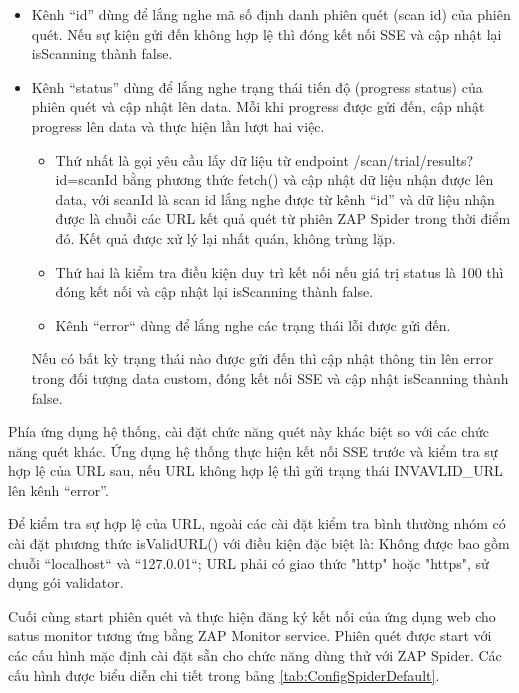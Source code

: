 \begin{itemize}
  \item Kênh “id” dùng để lắng nghe mã số định danh phiên quét (scan id) của phiên quét.
  Nếu sự kiện gửi đến không hợp lệ thì đóng kết nối SSE và cập nhật lại isScanning thành false.
  \item Kênh “status” dùng để lắng nghe trạng thái tiến độ (progress status) của phiên quét và cập nhật lên data.
  Mỗi khi progress được gửi đến, cập nhật progress lên data và thực hiện lần lượt hai việc.
  \begin{itemize}
    \item Thứ nhất là gọi yêu cầu lấy dữ liệu từ endpoint /scan/trial/results?id=scanId bằng phương thức fetch() và cập nhật dữ liệu nhận được lên data, với scanId là scan id lắng nghe được từ kênh “id” và dữ liệu nhận được là chuỗi các URL kết quả quét từ phiên ZAP Spider trong thời điểm đó.
    Kết quả được xử lý lại nhất quán, không trùng lặp.
    \item Thứ hai là kiểm tra điều kiện duy trì kết nối nếu giá trị status là 100 thì đóng kết nối và cập nhật lại isScanning thành false.
    \item Kênh “error“ dùng để lắng nghe các trạng thái lỗi được gửi đến.
  \end{itemize}
  Nếu có bất kỳ trạng thái nào được gửi đến thì cập nhật thông tin lên error trong đối tượng data custom, đóng kết nối SSE và cập nhật isScanning thành false.
\end{itemize}

Phía ứng dụng hệ thống, cài đặt chức năng quét này khác biệt so với các chức năng quét khác.
Ứng dụng hệ thống thực hiện kết nối SSE trước và kiểm tra sự hợp lệ của URL sau, nếu URL không hợp lệ thì gửi trạng thái INVAVLID\_URL lên kênh “error”.

Để kiểm tra sự hợp lệ của URL, ngoài các cài đặt kiểm tra bình thường nhóm có cài đặt phương thức isValidURL() với điều kiện đặc biệt là: Không được bao gồm chuỗi “localhost“ và “127.0.01“; URL phải có giao thức "http" hoặc "https", sử dụng gói validator.

Cuối cùng start phiên quét và thực hiện đăng ký kết nối của ứng dụng web cho satus monitor tương ứng bằng ZAP Monitor service.
Phiên quét được start với các cấu hình mặc định cài đặt sẵn cho chức năng dùng thử với ZAP Spider.
Các cấu hình được biểu diễn chi tiết trong bảng \ref{tab:ConfigSpiderDefault}.

